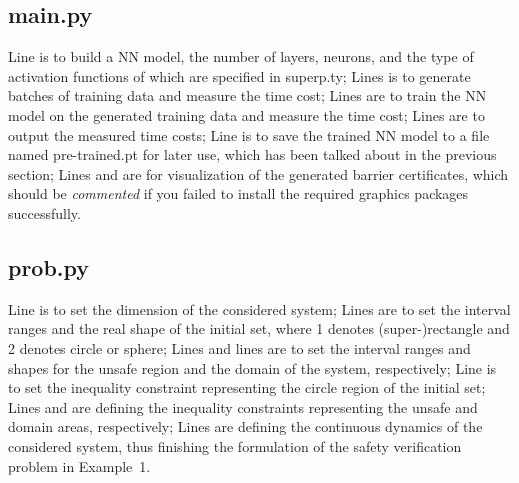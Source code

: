 \documentclass{llncs}
\begin{document}
\subsection{\textsf{main.py}}
Line 
is to build a NN model, the number of layers, neurons, and the type of activation functions of which are specified in \textsf{superp.ty};
Lines
is to generate batches of training data and measure the time cost; 
Lines
are to train the NN model on the generated training data and measure the time cost;
Lines
are to output the measured time costs; 
Line
is to save the trained NN model to a file named \textsf{pre-trained.pt} for later use, which has been talked about in the previous section;
Lines
and
are for visualization of the generated barrier certificates, which should be \emph{commented} if you
failed to install the required graphics packages successfully.

\subsection{\textsf{prob.py}}
Line
is to set the dimension of the considered system; Lines
are to set the interval ranges and the real shape of the initial set, where 1 denotes (super-)rectangle and 
2 denotes circle or sphere; Lines
and lines
are to set the interval ranges and shapes for the unsafe region and the domain of the system, respectively;
Line 
is to set the inequality constraint representing the circle region of the initial set; Lines
and 
are defining the inequality constraints representing the unsafe and domain areas, respectively;
Lines
are defining the continuous dynamics of the considered system, thus finishing the formulation of the
safety verification problem in Example~1.
\end{document}
